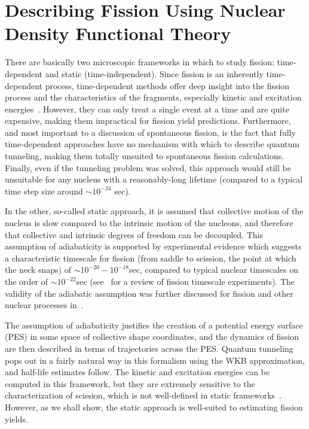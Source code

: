 \chapter{Describing Fission Using Nuclear Density Functional Theory}\label{chap:Model}


There are basically two microscopic frameworks in which to study fission: time-dependent and static (time-independent). Since fission is an inherently time-dependent process, time-dependent methods offer deep insight into the fission process and the characteristics of the fragments, especially kinetic and excitation energies~\cite{Scamps2018, Scamps2015a, Simenel2014, Grineviciute2018, Umar2010}. However, they can only treat a single event at a time and are quite expensive, making them impractical for fission yield predictions. Furthermore, and most important to a discussion of spontaneous fission, is the fact that fully time-dependent approaches have no mechanism with which to describe quantum tunneling, making them totally unsuited to spontaneous fission calculations. Finally, even if the tunneling problem was solved, this approach would still be unsuitable for any nucleus with a reasonably-long lifetime (compared to a typical time step size around ${\sim}10^{-24}$ sec).

In the other, so-called static approach, it is assumed that collective motion of the nucleus is slow compared to the intrinsic motion of the nucleons, and therefore that collective and intrinsic degrees of freedom can be decoupled. This assumption of adiabaticity is supported by experimental evidence which suggests a characteristic timescale for fission (from saddle to scission, the point at which the neck snaps) of ${\sim}10^{-20}-10^{-18}$sec, compared to typical nuclear timescales on the order of ${\sim}10^{-22}$sec (see~\cite{Jacquet2009} for a review of fission timescale experiments). The validity of the adiabatic assumption was further discussed for fission and other nuclear processes in~\cite{Nazarewicz1993}.

The assumption of adiabaticity justifies the creation of a potential energy surface (PES) in some space of collective shape coordinates, and the dynamics of fission are then described in terms of trajectories across the PES. Quantum tunneling pops out in a fairly natural way in this formalism using the WKB approximation, and half-life estimates follow. The kinetic and excitation energies can be computed in this framework, but they are extremely sensitive to the characterization of scission, which is not well-defined in static frameworks~\cite{Younes2011}. However, as we shall show, the static approach is well-suited to estimating fission yields.

